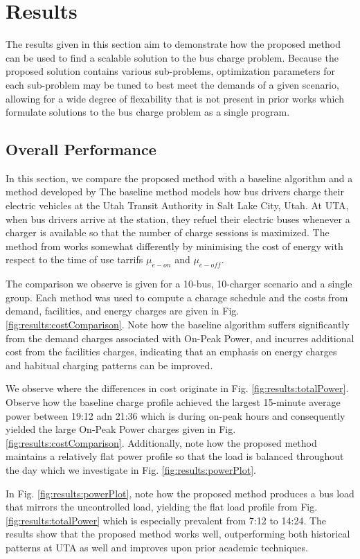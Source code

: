 \section{Results}
The results given in this section aim to demonstrate how the proposed method can be used to find a scalable solution to the bus charge problem. Because the proposed solution contains various sub-problems, optimization parameters for each sub-problem may be tuned to best meet the demands of a given scenario, allowing for a wide degree of flexability that is not present in prior works which formulate solutions to the bus charge problem as a single program.
\subsection{Overall Performance}
In this section, we compare the proposed method with a baseline algorithm and a method developed by \cite{he_battery_2022} The baseline method models how bus drivers charge their electric vehicles at the Utah Transit Authority in Salt Lake City, Utah. At UTA, when bus drivers arrive at the station, they refuel their electric buses whenever a charger is available so that the number of charge sessions is maximized. The method from \cite{he_battery_2022} works somewhat differently by minimising the cost of energy with respect to the time of use tarrifs $\mu_{e-on}$ and $\mu_{e-off}$.
\par The comparison we observe is given for a 10-bus, 10-charger scenario and a single group. Each method was used to compute a charage schedule and the costs from demand, facilities, and energy charges are given in Fig. \ref{fig:results:costComparison}. Note how the baseline algorithm suffers significantly from the demand charges associated with On-Peak Power, and \cite{he_battery_2022} incurres additional cost from the facilities charges, indicating that an emphasis on energy charges and habitual charging patterns can be improved.
\par We observe where the differences in cost originate in Fig. \ref{fig:results:totalPower}. Observe how the baseline charge profile achieved the largest 15-minute average power between 19:12 adn 21:36 which is during on-peak hours and consequently yielded the large On-Peak Power charges given in Fig. \ref{fig:results:costComparison}. Additionally, note how the proposed method maintains a relatively flat power profile so that the load is balanced throughout the day which we investigate in Fig. \ref{fig:results:powerPlot}.
\par In Fig. \ref{fig:results:powerPlot}, note how the proposed method produces a bus load that mirrors the uncontrolled load, yielding the flat load profile from Fig. \ref{fig:results:totalPower} which is especially prevalent from 7:12 to 14:24. The results show that the proposed method works well, outperforming both historical patterns at UTA as well and improves upon prior academic techniques.
 


